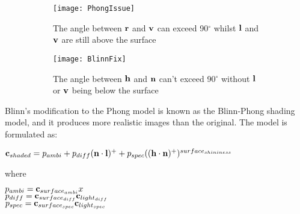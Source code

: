 \begin{figure}[h]
	\begin{subfigure}{0.48\textwidth}
		\texttt{[image: PhongIssue]}
		\caption{The angle between \begin{math}\mathbf{r}\end{math} and \begin{math}\mathbf{v}\end{math} can exceed 90$^{\circ}$ whilst \begin{math}\mathbf{l}\end{math} and \begin{math}\mathbf{v}\end{math} are still above the surface}
		\label{fig:PhongIssue}
	\end{subfigure}
	\hspace*{\fill}
	\begin{subfigure}{0.48\textwidth}
		\texttt{[image: BlinnFix]}
		\caption{The angle between \begin{math}\mathbf{h}\end{math} and \begin{math}\mathbf{n}\end{math} can't exceed 90$^{\circ}$ without \begin{math}\mathbf{l}\end{math} or \begin{math}\mathbf{v}\end{math} being below the surface }
		\label{fig:BlinnFix}
	\end{subfigure}
	\caption{}
\end{figure}

Blinn's modification to the Phong model is known as the Blinn-Phong shading model, and it produces more realistic images than the original. The model is formulated as:

\begin{center}
	\begin{math}\mathbf{c}_{shaded} = p_{ambi} + p_{diff}(\mathbf{n}\cdot\mathbf{l})^+ + p_{spec}((\mathbf{h}\cdot\mathbf{n})^+)^{surface_{shininess}}\end{math}
\end{center}

where

\begin{center}
	\begin{math}p_{ambi} = \mathbf{c}_{surface_{ambi}}x\end{math} \\
	\begin{math}p_{diff} = \mathbf{c}_{surface_{diff}}\mathbf{c}_{light_{diff}}\end{math} \\
	\begin{math}p_{spec} = \mathbf{c}_{surface_{spec}}\mathbf{c}_{light_{spec}}\end{math}
\end{center}


